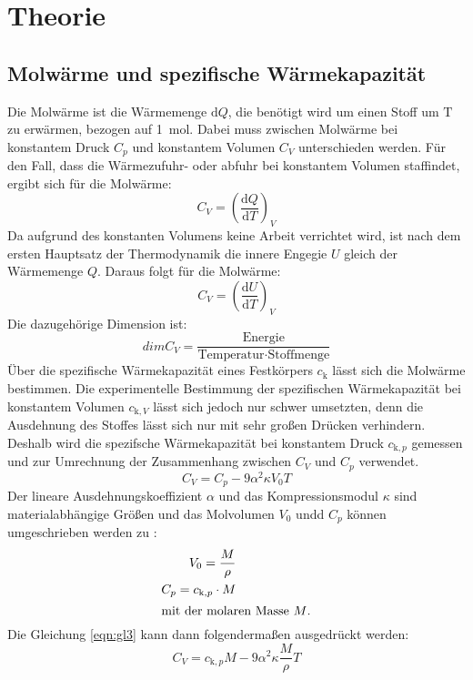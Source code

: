 \section{Theorie}
\label{sec:Theorie}

\subsection{Molwärme und spezifische Wärmekapazität}
\label{sec:molwärme}

Die Molwärme ist die Wärmemenge $\text{d}Q$, die benötigt wird um einen Stoff um $\text{T}$ zu erwärmen, bezogen auf \SI{1}{\mol}.
Dabei muss zwischen Molwärme bei konstantem Druck $C_p$ und konstantem Volumen $C_V$ unterschieden werden.
Für den Fall, dass die Wärmezufuhr- oder abfuhr bei konstantem Volumen staffindet, ergibt sich für die Molwärme:
\begin{equation}
  C_V = \left(\frac{\text{d}Q}{\text{d}T}\right)_V
  \label{eqn:gl1}
\end{equation}
Da aufgrund des konstanten Volumens keine Arbeit verrichtet wird, ist nach dem ersten Hauptsatz der Thermodynamik die innere Engegie $U$ gleich der Wärmemenge $Q$.
Daraus folgt für die Molwärme:
\begin{equation}
  C_V = \left(\frac{\text{d}U}{\text{d}T}\right)_V
  \label{eqn:gl2}
\end{equation}
Die dazugehörige Dimension ist:
\begin{equation*}
  dim C_V = \frac{\text{Energie}}{\text{Temperatur} \cdot \text{Stoffmenge}}
\end{equation*}
Über die spezifische Wärmekapazität eines Festkörpers $c_\text{k}$ lässt sich die Molwärme bestimmen.
Die experimentelle Bestimmung der spezifischen Wärmekapazität  bei konstantem Volumen $c_{\text{k},V}$ lässt sich jedoch nur schwer umsetzten, denn die Ausdehnung des Stoffes lässt sich nur mit sehr großen Drücken verhindern.
Deshalb wird die spezifsche Wärmekapazität bei konstantem Druck $c_{\text{k},p}$ gemessen und zur Umrechnung der Zusammenhang zwischen $C_V$ und $C_p$ verwendet.
\begin{equation}
  C_V = C_p - 9 \alpha^2 \kappa V_0 T
  \label{eqn:gl3}
\end{equation}
Der lineare Ausdehnungskoeffizient $\alpha$ und das Kompressionsmodul $\kappa$ sind materialabhängige Größen und das Molvolumen $V_0$ undd $C_p$ können umgeschrieben werden zu \cite{Molwärme}:
\begin{align*}
  V_0 = \frac{M}{\rho} \\
  C_p = c_{\text{k},p} \cdot M \\
  \intertext{mit der molaren Masse $M$.}
\end{align*}
Die Gleichung \eqref{eqn:gl3} kann dann folgendermaßen ausgedrückt werden:
\begin{equation}
  C_V = c_{\text{k},p} M - 9 \alpha^2 \kappa \frac{M}{\rho} T
  \label{eqn:gl4}
\end{equation}
